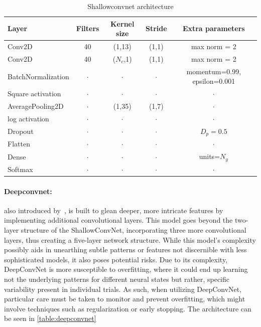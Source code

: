 \begin{table}[h!]
\caption{Shallowconvnet architecture}\label{table:shallownet}
\centering
\begin{tabular}{l|c|c|c|c}
\hline
\textbf{Layer} & \textbf{Filters} & \textbf{Kernel size} & \textbf{Stride} & \textbf{Extra parameters}\\
\hline
Conv2D & 40 & (1,13) & (1,1)&max norm = 2 \\
Conv2D & 40 & ($N_c$,1) & (1,1)&max norm = 2 \\
BatchNormalization & $\cdot$ & $\cdot$ & $\cdot$ & momentum=0.99, epsilon=0.001\\ 
Square activation & $\cdot$ & $\cdot$ & $\cdot$ & $\cdot$\\
AveragePooling2D & $\cdot$ &(1,35) & (1,7)& $\cdot$\\
log activation & $\cdot$ & $\cdot$ & $\cdot$ & $\cdot$\\
Dropout & $\cdot$ & $\cdot$ & $\cdot$ & $D_p = 0.5$\\
\hline
Flatten & $\cdot$ & $\cdot$ & $\cdot$ & $\cdot$\\
Dense & $\cdot$ & $\cdot$ & $\cdot$ & units=$N_y$\\
Softmax & $\cdot$ & $\cdot$ & $\cdot$ & $\cdot$\\
\hline
\end{tabular}
\end{table}

\paragraph{Deepconvnet:} also introduced by~\cite{schirrmeister2017deep}, is built to glean deeper, more intricate features by implementing additional convolutional layers. This model goes beyond the two-layer structure of the ShallowConvNet, incorporating three more convolutional layers, thus creating a five-layer network structure. While this model's complexity possibly aids in unearthing subtle patterns or features not discernible with less sophisticated models, it also poses potential risks. Due to its complexity, DeepConvNet is more susceptible to overfitting, where it could end up learning not the underlying patterns for different neural states but rather, specific variability present in individual trials. As such, when utilizing DeepConvNet, particular care must be taken to monitor and prevent overfitting, which might involve techniques such as regularization or early stopping. The architecture can be seen in \cref{table:deepconvnet}

